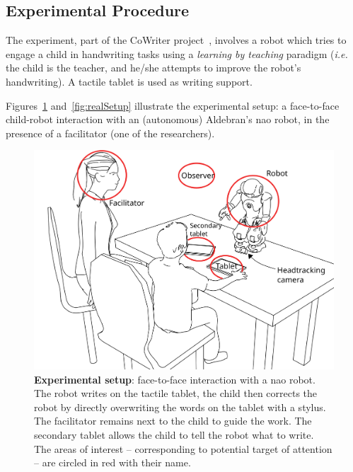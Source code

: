 \documentclass{sig-alternate}
\newcommand{\ie}{\textit{i.e.}\xspace}
\begin{document}
\subsection{Experimental Procedure}

The experiment, part of the CoWriter project~\cite{Hood:2015}, involves a robot
which tries to engage a child in handwriting tasks using a \emph{learning by
teaching} paradigm (\ie the child is the teacher, and he/she attempts to improve
the robot's handwriting). A tactile tablet is used as writing support.

Figures~\ref{fig:setup} and~\ref{fig:realSetup} illustrate the experimental
setup: a face-to-face child-robot interaction with an (autonomous) Aldebran's
{\sc nao} robot, in the presence of a facilitator (one of the researchers).

\begin{figure}[h!]
    \centering
    \includegraphics[width=0.8\columnwidth]{experimental_setup}
    \caption{\small \textbf{Experimental setup}: face-to-face interaction with a {\sc
            nao} robot. The robot writes on the tactile tablet, the child then
            corrects the robot by directly overwriting the words on the tablet
            with a stylus. The facilitator remains next to the child to guide the work. 
            The secondary tablet allows the child to tell the robot what to
            write. The areas of interest -- corresponding to potential target of
            attention -- are circled in red with their name.}
    \label{fig:setup}
\end{figure}
\end{document}
